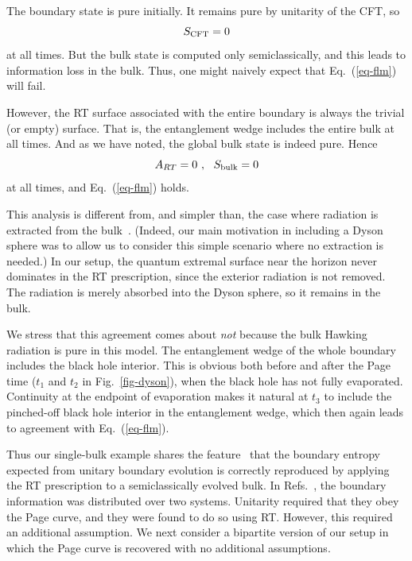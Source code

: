 \documentclass[12pt,letterpaper]{article}
\begin{document}
The boundary state is pure initially. It remains pure by unitarity of the CFT, so
\begin{equation}
  S_{\rm CFT}=0
\end{equation}
at all times. But the bulk state is computed only semiclassically, and this leads to information loss in the bulk. Thus, one might naively expect that Eq.~(\ref{eq-flm}) will fail. 

However, the RT surface associated with the entire boundary is always the trivial (or empty) surface. That is, the entanglement wedge includes the entire bulk at all times. And as we have noted, the global bulk state is indeed pure. Hence
\begin{equation}
  A_{RT}=0~,~~S_{\rm bulk}=0
\end{equation}
at all times, and Eq.~(\ref{eq-flm}) holds.

This analysis is different from, and simpler than, the case where radiation is extracted from the bulk~\cite{Pen19,AEMM}. (Indeed, our main motivation in including a Dyson sphere was to allow us to consider this simple scenario where no extraction is needed.) In our setup, the quantum extremal surface near the horizon never dominates in the RT prescription, since the exterior radiation is not removed. The radiation is merely absorbed into the Dyson sphere, so it remains in the bulk.

We stress that this agreement comes about {\em not} because the bulk Hawking radiation is pure in this model. The entanglement wedge of the whole boundary includes the black hole interior. This is obvious both before and after the Page time ($t_1$ and $t_2$ in Fig.~\ref{fig-dyson}), when the black hole has not fully evaporated. Continuity at the endpoint of evaporation makes it natural at $t_3$ to include the pinched-off black hole interior in the entanglement wedge, which then again leads to agreement with Eq.~(\ref{eq-flm}).

Thus our single-bulk example shares the feature~\cite{Pen19,AEMM} that the boundary entropy expected from unitary boundary evolution is correctly reproduced by applying the RT prescription to a semiclassically evolved bulk. In Refs.~\cite{Pen19}, the boundary information was distributed over two systems. Unitarity required that they obey the Page curve, and they were found to do so using RT. However, this required an additional assumption. We next consider a bipartite version of our setup in which the Page curve is recovered with no additional assumptions.
\end{document}
